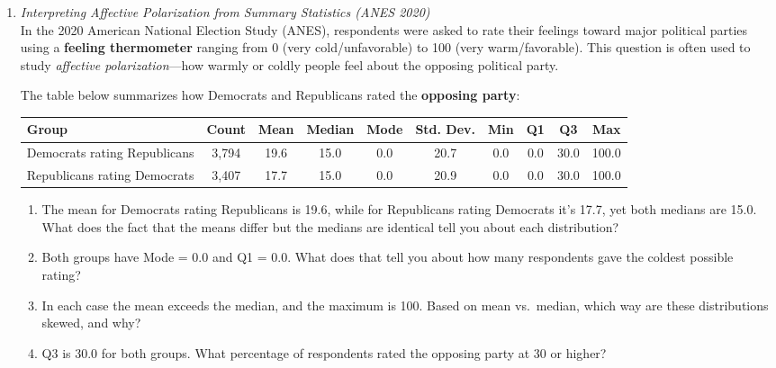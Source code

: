\documentclass{article}
\begin{document}
\begin{enumerate}
\item \emph{Interpreting Affective Polarization from Summary Statistics (ANES 2020)} \\[0.5em]
In the 2020 American National Election Study (ANES), respondents were asked to rate their feelings toward major political parties using a \textbf{feeling thermometer} ranging from 0 (very cold/unfavorable) to 100 (very warm/favorable). This question is often used to study \emph{affective polarization}—how warmly or coldly people feel about the opposing political party.

The table below summarizes how Democrats and Republicans rated the \textbf{opposing party}:

\begin{center}
\begin{tabular}{|p{2.9cm}|c|c|c|c|c|c|c|c|c|}
\hline
\textbf{Group} & \textbf{Count} & \textbf{Mean} & \textbf{Median} & \textbf{Mode} & \textbf{Std. Dev.} & \textbf{Min} & \textbf{Q1} & \textbf{Q3} & \textbf{Max} \\
\hline
Democrats rating Republicans & 3,794 & 19.6 & 15.0 & 0.0 & 20.7 & 0.0 & 0.0 & 30.0 & 100.0 \\
Republicans rating Democrats & 3,407 & 17.7 & 15.0 & 0.0 & 20.9 & 0.0 & 0.0 & 30.0 & 100.0 \\
\hline
\end{tabular}
\end{center}

\begin{enumerate}
\item The mean for Democrats rating Republicans is 19.6, while for Republicans rating Democrats it’s 17.7, yet both medians are 15.0. What does the fact that the means differ but the medians are identical tell you about each distribution?

\item Both groups have Mode = 0.0 and Q1 = 0.0. What does that tell you about how many respondents gave the coldest possible rating?

\item In each case the mean exceeds the median, and the maximum is 100. Based on mean vs.\ median, which way are these distributions skewed, and why?

\item Q3 is 30.0 for both groups. What percentage of respondents rated the opposing party at 30 or higher?
\end{enumerate}




\end{enumerate}
\end{document}
